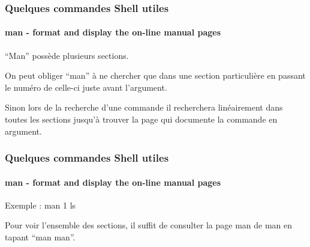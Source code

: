 \documentclass{beamer}
\begin{document}
            \begin{frame}
                \frametitle{Quelques commandes Shell utiles}
                \framesubtitle{man - format and display the on-line manual pages}
                \foreignquote{french}{Man} possède plusieurs sections.
                
                On peut obliger \foreignquote{french}{man} à ne chercher que dans une section particulière en passant le numéro de celle-ci juste avant l'argument.
                
                Sinon lors de la recherche d'une commande il recherchera linéairement dans toutes les sections jusqu'à trouver la page qui documente la commande en argument.
            \end{frame}
            
            \begin{frame}
                \frametitle{Quelques commandes Shell utiles}
                \framesubtitle{man - format and display the on-line manual pages}
                Exemple : man 1 ls
                
                Pour voir l'ensemble des sections, il suffit de consulter la page man de man en tapant \foreignquote{french}{man man}.
            \end{frame}
\end{document}
